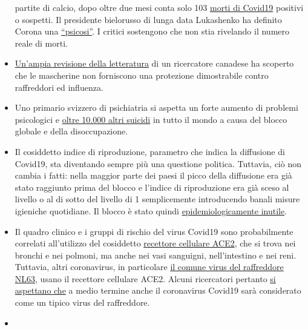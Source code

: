 \begin{itemize}
  partite di calcio, dopo oltre due mesi conta solo 103
  \href{https://en.wikipedia.org/wiki/COVID-19_pandemic_in_Belarus}{morti
  di Covid19} positivi o sospetti. Il presidente bielorusso di lunga
  data Lukashenko ha definito Corona una
  \href{https://www.baltictimes.com/lukashenko__coronavirus_is_psychosis/}{``psicosi''}.
  I critici sostengono che non stia rivelando il numero reale di morti.
\item
  \href{https://www.researchgate.net/publication/340570735_Masks_Don't_Work_A_review_of_science_relevant_to_COVID-19_social_policy}{Un'ampia
  revisione della letteratura} di un ricercatore canadese ha scoperto
  che le mascherine non forniscono una protezione dimostrabile contro
  raffreddori ed influenza.
\item
  Uno primario svizzero di psichiatria si aspetta un forte aumento di
  problemi psicologici e
  \href{https://www.aargauerzeitung.ch/aargau/kanton-aargau/aargauer-psychiatrie-chefarzt-kawohl-warnt-arbeitslosigkeit-erhoeht-das-suizidrisiko-137742663}{oltre
  10.000 altri suicidi} in tutto il mondo a causa del blocco globale e
  della disoccupazione.
\item
  Il cosiddetto indice di riproduzione, parametro che indica la
  diffusione di Covid19, sta diventando sempre più una questione
  politica. Tuttavia, ciò non cambia i fatti: nella maggior parte dei
  paesi il picco della diffusione era già stato raggiunto prima del
  blocco e l'indice di riproduzione era già sceso al livello o al di
  sotto del livello di 1 semplicemente introducendo banali misure
  igieniche quotidiane. Il blocco è stato quindi
  \href{https://infekt.ch/2020/04/sind-wir-tatsaechlich-im-blindflug/}{epidemiologicamente
  inutile}.
\item
  Il quadro clinico e i gruppi di rischio del virus Covid19 sono
  probabilmente correlati all'utilizzo del cosiddetto
  \href{https://www.news-medical.net/news/20200420/ACE2-TMPRSS2-profiling-indicates-tissue-vulnerability-to-SARS-CoV-2-infection.aspx}{recettore
  cellulare ACE2}, che si trova nei bronchi e nei polmoni, ma anche nei
  vasi sanguigni, nell'intestino e nei reni. Tuttavia, altri
  coronavirus, in particolare
  \href{https://www.ncbi.nlm.nih.gov/pmc/articles/PMC4369385/}{il comune
  virus del raffreddore NL63}, usano il recettore cellulare ACE2. Alcuni
  ricercatori pertanto
  \href{https://www.ncbi.nlm.nih.gov/pmc/articles/PMC7074995/}{si
  aspettano che} a medio termine anche il coronavirus Covid19 sarà
  considerato come un tipico virus del raffreddore.
\item

\end{itemize}
